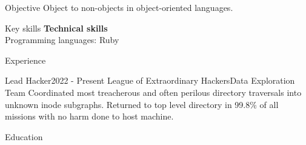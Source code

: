 \documentclass{resume}
\begin{document}
\maketitle
\thispagestyle{empty} %


\begin{component}{Objective}
  Object to non-objects in object-oriented languages.
\end{component}

\begin{component}{Key skills}
\textbf{Technical skills}\\
Programming languages: Ruby\\
\end{component}

\begin{component}{Experience}
  \begin{position}{Lead Hacker}{2022 - Present}
    {League of Extraordinary Hackers}{Data Exploration Team}
    Coordinated most treacherous and often perilous directory traversals into
    unknown inode subgraphs. Returned to top level directory in 99.8\% of all
    missions with no harm done to host machine.
  \end{position}
\end{component}

\begin{component}{Education}
\end{component}
\end{document}
